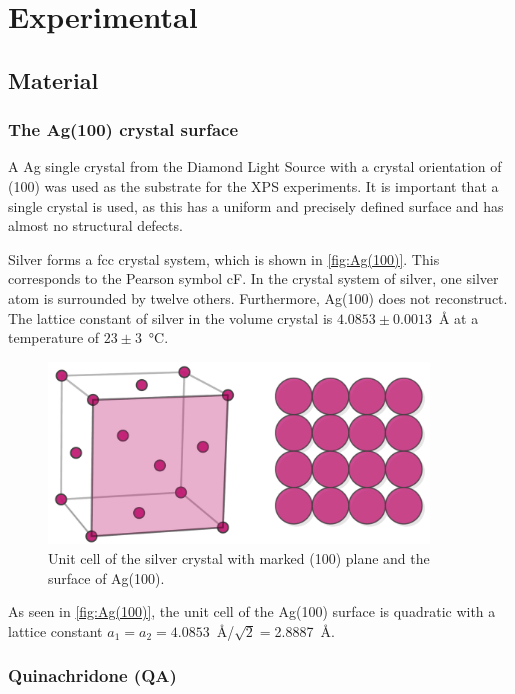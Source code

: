 \chapter{Experimental}
\section{Material}

\subsection{The Ag(100) crystal surface}
A \acf{Ag} single crystal from the Diamond Light Source with a crystal orientation of (100) was used as the substrate for the \ac{XPS} experiments. It is important that a single crystal is used, as this has a uniform and precisely defined surface and has almost no structural defects.

Silver forms a \ac{fcc} crystal system, which is shown in \autoref{fig:Ag(100)}. This corresponds to the Pearson symbol cF. In the crystal system of silver, one silver atom is surrounded by twelve others. Furthermore, Ag(100) does not reconstruct. The lattice constant of silver in the volume crystal is $4.0853\pm0.0013$~\si{\angstrom} at a temperature of $23\pm3$~\si{\celsius}\autocite{Liu1973}.

\begin{figure}[H]
	\centering
	\includegraphics[width=0.9\textwidth]{images/Ag(100).pdf}
	\caption{Unit cell of the silver crystal with marked (100) plane and the surface of Ag(100).}
	\label{fig:Ag(100)}
\end{figure}

As seen in \autoref{fig:Ag(100)}, the unit cell of the Ag(100) surface is quadratic with a lattice constant $a_1=a_2=4.0853$~\si{\angstrom}/$\sqrt{2}=$2.8887~\si{\angstrom}.

\newpage
\subsection{Quinachridone (QA)}

